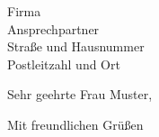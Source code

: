 \documentclass{friggeri-minimal-letter}
\date{\today}
\begin{document}
\begin{letter}{%
    Firma\\
    Ansprechpartner\\
    Straße und Hausnummer\\
    Postleitzahl und Ort}
%
%
\opening{Sehr geehrte Frau Muster,}
%
\Blindtext[1]
%
\closing{Mit freundlichen Grüßen}


\end{letter}
\end{document}
